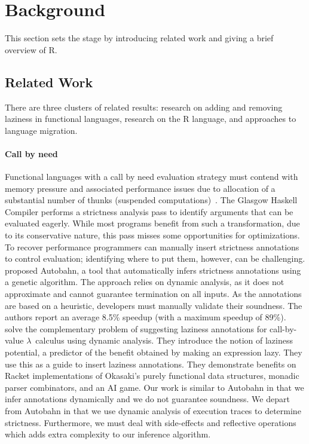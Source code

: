 \documentclass[review,creen,acmsmall]{acmart}
\begin{document}
\newpage
\section{Background}\label{sec:background}

This section sets the stage by introducing related work and giving a brief
overview of R.

\subsection{Related Work}

There are three clusters of related results: research on adding and removing
laziness in functional languages, research on the R language, and approaches to
language migration.

\paragraph{Call by need}  Functional languages with
a call by need evaluation strategy must contend with memory pressure and
associated performance issues due to allocation of a substantial number of
thunks (suspended computations)~\cite{transformopt,stricteffective,opteval}. The
Glasgow Haskell Compiler performs a strictness analysis pass to identify
arguments that can be evaluated eagerly. While most programs benefit from such a
transformation, due to its conservative nature, this pass misses some
opportunities for optimizations. To recover performance programmers can manually
insert strictness annotations to control evaluation; identifying where to put
them, however, can be challenging. \citet{autobahn} proposed Autobahn, a tool
that automatically infers strictness annotations using a genetic algorithm. The
approach relies on dynamic analysis, as it does not approximate and cannot
guarantee termination on all inputs. As the annotations are based on a
heuristic, developers must manually validate their soundness. The authors report
an average 8.5\% speedup (with a maximum speedup of 89\%). \citet{lazyprof}
solve the complementary problem of suggesting laziness annotations for
call-by-value $\lambda$~calculus using dynamic analysis. They introduce the
notion of laziness potential, a predictor of the benefit obtained by making an
expression lazy. They use this as a guide to insert laziness annotations. They
demonstrate benefits on Racket implementations of Okasaki's purely functional
data structures, monadic parser combinators, and an AI game. Our work is similar
to Autobahn in that we infer annotations dynamically and we do not guarantee
soundness. We depart from Autobahn in that we use dynamic analysis of
execution traces to determine strictness. Furthermore, we must deal with
side-effects and reflective operations which adds extra complexity to our
inference algorithm.
\end{document}
